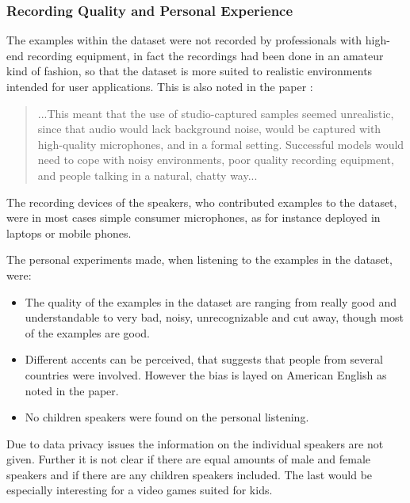 \subsubsection{Recording Quality and Personal Experience}
The examples within the dataset were not recorded by professionals with high-end recording equipment, in fact the recordings had been done in an amateur kind of fashion, so that the dataset is more suited to realistic environments intended for user applications.
This is also noted in the paper \cite{Warden2018}:
\begin{quote}
...This meant that the use of studio-captured samples seemed unrealistic, since that audio would lack background noise, would be captured with high-quality microphones, and in a formal setting. 
Successful models would need to cope with noisy environments, poor quality recording equipment, and people talking in a natural, chatty way...
\end{quote}
The recording devices of the speakers, who contributed examples to the dataset, were in most cases simple consumer microphones, as for instance deployed in laptops or mobile phones.

The personal experiments made, when listening to the examples in the dataset, were:
\begin{itemize}
  \item The quality of the examples in the dataset are ranging from really good and understandable to very bad, noisy, unrecognizable and cut away, though most of the examples are good.

  \item Different accents can be perceived, that suggests that people from several countries were involved. However the bias is layed on American English as noted in the paper.

  \item No children speakers were found on the personal listening.
\end{itemize}

Due to data privacy issues the information on the individual speakers are not given.
Further it is not clear if there are equal amounts of male and female speakers and if there are any children speakers included.
The last would be especially interesting for a video games suited for kids.

